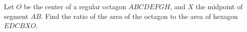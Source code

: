 Let $O$ be the center of a regular octagon $ABCDEFGH$, and $X$ the midpoint of segment $AB$. Find the ratio of the area of the octagon to the area of hexagon $EDCBXO$.
